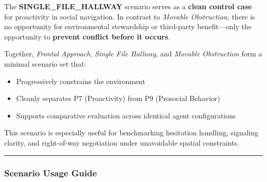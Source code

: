 \documentclass[utf8]{frontiers_suppmat} %
\providecommand{\tightlist}{%
  \setlength{\itemsep}{0pt}\setlength{\parskip}{0pt}}
\begin{document}
The \textbf{SINGLE\_FILE\_HALLWAY} scenario serves as a \textbf{clean
control case} for proactivity in social navigation. In contrast to
\emph{Movable Obstruction}, there is no opportunity for environmental
stewardship or third‑party benefit---only the opportunity to
\textbf{prevent conflict before it occurs}.

Together, \emph{Frontal Approach}, \emph{Single File Hallway}, and
\emph{Movable Obstruction} form a minimal scenario set that:

\begin{itemize}
\tightlist
\item
  Progressively constrains the environment
\item
  Cleanly separates P7 (Proactivity) from P9 (Prosocial Behavior)
\item
  Supports comparative evaluation across identical agent configurations
\end{itemize}

This scenario is especially useful for benchmarking hesitation handling,
signaling clarity, and right‑of‑way negotiation under unavoidable
spatial constraints.

\begin{center}\rule{0.5\linewidth}{0.5pt}\end{center}

\subsubsection{Scenario Usage Guide}\label{scenario-usage-guide}
\end{document}
